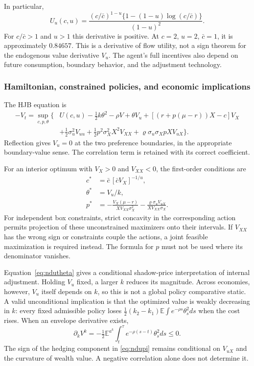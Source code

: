 \documentclass[ecta,nameyear,draft]{econsocart}
\theoremstyle{definition}
\theoremstyle{remark}
\newcommand{\E}{\mathbb E}
\begin{document}
In particular,
\begin{equation}\label{eq:uderivative}
 U_u(c,u)=\frac{(c/\bar c)^{1-u}\{1-(1-u)\log(c/\bar c)\}}{(1-u)^2}.
\end{equation}
For $c/\bar c>1$ and $u>1$ this derivative is positive. At $c=2$, $u=2$, $\bar c=1$, it is approximately $0.84657$. This is a derivative of flow utility, not a sign theorem for the endogenous value derivative $V_u$. The agent's full incentives also depend on future consumption, boundary behavior, and the adjustment technology.

\subsubsection{Hamiltonian, constrained policies, and economic implications}
The HJB equation is
\begin{align}\label{eq:nduhjb}
 -V_t=\sup_{c,p,\theta}\big\{&U(c,u)-\tfrac12 k\theta^2-\rho V
 +\theta V_u+[(r+p(\mu-r))X-c]V_X\nonumber\\
 &+\tfrac12\sigma_u^2V_{uu}+\tfrac12p^2\sigma_X^2X^2V_{XX}
 +\varrho\sigma_u\sigma_X pX V_{uX}\big\}.
\end{align}
Reflection gives $V_u=0$ at the two preference boundaries, in the appropriate boundary-value sense. The correlation term is retained with its correct coefficient.

For an interior optimum with $V_X>0$ and $V_{XX}<0$, the first-order conditions are
\begin{align}
 c^*&=\bar c\,[\bar c V_X]^{-1/u},\label{eq:nduc}\\
 \theta^*&=V_u/k,\label{eq:ndutheta}\\
 p^*&=-\frac{V_X(\mu-r)}{XV_{XX}\sigma_X^2}
       -\frac{\varrho\sigma_u V_{uX}}{XV_{XX}\sigma_X}.\label{eq:ndupi}
\end{align}
For independent box constraints, strict concavity in the corresponding action permits projection of these unconstrained maximizers onto their intervals. If $V_{XX}$ has the wrong sign or constraints couple the actions, a joint feasible maximization is required instead. The formula for $p$ must not be used where its denominator vanishes.

Equation~\eqref{eq:ndutheta} gives a conditional shadow-price interpretation of internal adjustment. Holding $V_u$ fixed, a larger $k$ reduces its magnitude. Across economies, however, $V_u$ itself depends on $k$, so this is not a global policy comparative static. A valid unconditional implication is that the optimized value is weakly decreasing in $k$: every fixed admissible policy loses $\tfrac12(k_2-k_1)\E\int e^{-\rho s}\theta_s^2ds$ when the cost rises. When an envelope derivative exists,
\begin{equation}\label{eq:envelope}
 \partial_k V^k=-\tfrac12\E^{a^k}\int_t^\tau e^{-\rho(s-t)}\theta_s^2ds\leq0.
\end{equation}
The sign of the hedging component in \eqref{eq:ndupi} remains conditional on $V_{uX}$ and the curvature of wealth value. A negative correlation alone does not determine it.
\end{document}
